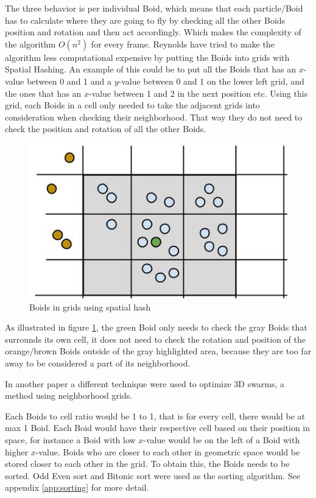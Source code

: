 The three behavior is per individual Boid, which means that each particle/Boid has to calculate where they are going to fly by checking all the other Boids position and rotation and then act accordingly. Which makes the complexity of the algorithm $ O(n^2)$ for every frame. 
Reynolds have tried to make the algorithm less computational expensive by putting the Boids into grids with Spatial Hashing. An example of this could be to put all the Boids that has an $x$-value between 0 and 1 and a $y$-value between 0 and 1 on the lower left grid, and the ones that has an $x$-value between 1 and 2 in the next position etc. Using this grid, each Boids in a cell only needed to take the adjacent grids into consideration when checking their neighborhood. That way they do not need to check the position and rotation of all the other Boids.
\begin{figure}[h!]
    \centering
    \includegraphics[width=0.8\linewidth]{images/boid_spatialhash}
    \caption{Boids in grids using spatial hash} \label{fig:spatialhash}
\end{figure}
As illustrated in figure \ref{fig:spatialhash}, the green Boid only needs to check the gray Boids that surrounds its own cell, it does not need to check the rotation and position of the orange/brown Boids outside of the gray highlighted area, because they are too far away to be considered a part of its neighborhood.

In another paper \citep{Joselli2009} a different technique were used to optimize 3D swarms, a method using neighborhood grids.

Each Boids to cell ratio would be 1 to 1, that is for every cell, there would be at max 1 Boid. Each Boid would have their respective cell based on their position in space, for instance a Boid with low $x$-value would be on the left of a Boid with higher $x$-value. Boids who are closer to each other in geometric space would be stored closer to each other in the grid. To obtain this, the Boids needs to be sorted. Odd Even sort and Bitonic sort were used as the sorting algorithm. See appendix \ref{app:sorting} for more detail.

